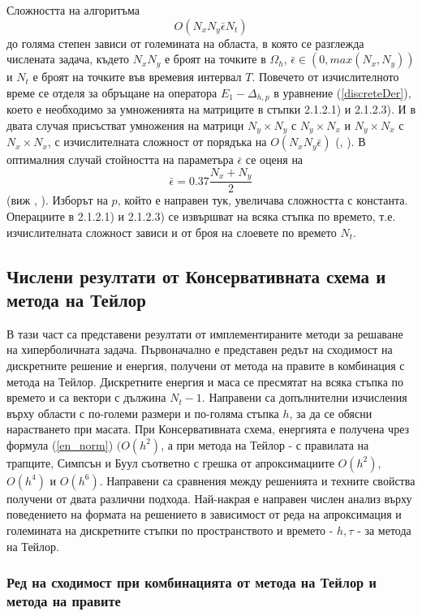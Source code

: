 \documentclass[a4paper]{article}
\newcommand{\rf}[1]{(\ref{#1})}
\theoremstyle{remark}
\begin{document}
\begin{large}
Сложността на алгоритъма 
$$ O(N_x N_y \bar \epsilon N_t ) $$
до голяма степен зависи от големината на областа, в която се разглежда числената задача, където $N_x N_y$ е броят на точките в $\Omega_h$, $\bar\epsilon \in (0, max(N_x,N_y) )$ и $N_t$ е броят на точките във времевия интервал $T$. Повечето от изчислителното време се отделя за обръщане на оператора $E_1-\Delta_{h,p}$ в уравнение \rf{discreteDer}, което е необходимо за умноженията на матриците в стъпки 2.1.2.1) и 2.1.2.3). И в двата случая присъстват умножения на матрици $N_y \times N_y$ с  $N_y \times N_x$ и $N_y \times N_x$ с  $N_x \times N_x$, с изчислителната сложност от порядъка на $ O( N_x N_y \bar\epsilon)$ (\cite{ref26}, \cite{ref27}). В оптималния случай стойността на параметъра $\bar\epsilon$ се оценя на 
$$\bar\epsilon = 0.37\frac{N_x + N_y}{2}$$ 
(виж \cite{ref26}, \cite{ref27}). Изборът на $p$, който е направен тук, увеличава сложността с константа. Операциите в 2.1.2.1) и 2.1.2.3) се извършват на всяка стъпка по времето, т.е. изчислителната сложност зависи и от броя на слоевете по времето $N_t$.

\subsection{Числени резултати от Консервативната схема и метода на Тейлор }\label{hypResultsHead}
В тази част са представени резултати от имплементираните методи за решаване на хиперболичната задача.
Първоначално е представен редът на сходимост на дискретните решение и енергия, получени от метода на правите в комбинация с метода на Тейлор. Дискретните енергия и маса се пресмятат на всяка стъпка по времето и са вектори с дължина $N_t - 1$. Направени са допълнителни изчисления върху области с по-големи размери и по-голяма стъпка $h$, за да се обясни нарастването при масата. При Консервативната схема, енергията е получена чрез формула \rf{en_norm} $(O(h^{2})$, а при метода на Тейлор - с правилата на трапците, Симпсън и Буул съответно с грешка от апроксимациите $O(h^{2})$, $O(h^{4})$ и $O(h^{6})$. Направени са сравнения между решенията и техните свойства получени от двата различни подхода. Най-накрая е направен числен анализ върху поведението на формата на решението в зависимост от реда на апроксимация и големината на дискретните стъпки по пространството и времето - $h, \tau$ - за метода на Тейлор.

\subsubsection{Ред на сходимост при комбинацията от метода на Тейлор и метода на правите}
\begin{table}[ht]
\centering
\small
		\begin{tabular}{||c|l|ll|ll||}
			\hline
			\hline



\end{tabular}
\end{table}
\end{large}
\end{document}
